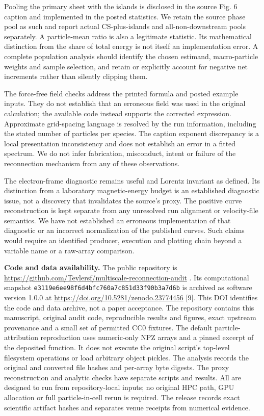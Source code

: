Pooling the primary sheet with the islands is disclosed in the source
Fig. 6 caption and implemented in the posted statistics. We retain the
source phase pool as such and report actual CS-plus-islands and
all-non-downstream pools separately. A particle-mean ratio is also a
legitimate statistic. Its mathematical distinction from the share of
total energy is not itself an implementation error. A complete
population analysis should identify the chosen estimand, macro-particle
weights and sample selection, and retain or explicitly account for
negative net increments rather than silently clipping them.

The force-free field checks address the printed formula and posted
example inputs. They do not establish that an erroneous field was used
in the original calculation; the available code instead supports the
corrected expression. Approximate grid-spacing language is resolved by
the run information, including the stated number of particles per
species. The caption exponent discrepancy is a local presentation
inconsistency and does not establish an error in a fitted spectrum. We
do not infer fabrication, misconduct, intent or failure of the
reconnection mechanism from any of these observations.

The electron-frame diagnostic remains useful and Lorentz invariant as
defined. Its distinction from a laboratory magnetic-energy budget is an
established diagnostic issue, not a discovery that invalidates the
source's proxy. The positive curve reconstruction is kept separate from
any unresolved run alignment or velocity-file semantics. We have not
established an erroneous implementation of that diagnostic or an
incorrect normalization of the published curves. Such claims would
require an identified producer, execution and plotting chain beyond a
variable name or a raw-array comparison.

\textbf{Code and data availability.} The public repository is
\url{https://github.com/Teylersf/multiscale-reconnection-audit} . Its
computational snapshot \nolinkurl{e3119e6ee98f6d4bfc760a7c851d33f90b3a7d6b}
is archived as software version 1.0.0 at
\url{https://doi.org/10.5281/zenodo.23774456} {[}9{]}. This DOI
identifies the code and data archive, not a paper acceptance. The
repository contains this manuscript, original audit code, reproducible
results and figures, exact upstream provenance and a small set of
permitted CC0 fixtures. The default particle-attribution reproduction
uses numeric-only NPZ arrays and a pinned excerpt of the deposited
function. It does not execute the original script's top-level filesystem
operations or load arbitrary object pickles. The analysis records the
original and converted file hashes and per-array byte digests. The proxy
reconstruction and analytic checks have separate scripts and results.
All are designed to run from repository-local inputs; no original HPC
path, GPU allocation or full particle-in-cell rerun is required. The
release records exact scientific artifact hashes and separates venue
receipts from numerical evidence.

